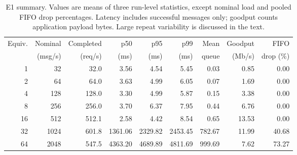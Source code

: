 \begin{table}[t]
    \centering
    \caption{E1 summary. Values are means of three run-level statistics,
    except nominal load and pooled FIFO drop percentages. Latency
    includes successful messages only; goodput counts application
    payload bytes. Large repeat variability is discussed in the text.}
    \label{tab:e1story-summary}
    \small
    \setlength{\tabcolsep}{4pt}
    \begin{tabular}{rrrrrrrrr}
        \toprule
        Equiv. & Nominal & Completed & p50 & p95 & p99 & Mean & Goodput & FIFO \\
        & (msg/s) & (req/s) & (ms) & (ms) & (ms) & queue & (Mb/s) & drop (\%) \\
        \midrule
        1  & 32   & 32.0  & 3.56    & 4.54    & 5.45    & 0.03   & 0.85  & 0.00 \\
        2  & 64   & 64.0  & 3.63    & 4.99    & 6.05    & 0.07   & 1.69  & 0.00 \\
        4  & 128  & 128.0 & 3.30    & 4.99    & 5.87    & 0.15   & 3.38  & 0.00 \\
        8  & 256  & 256.0 & 3.70    & 6.37    & 7.95    & 0.44   & 6.76  & 0.00 \\
        16 & 512  & 512.1 & 2.58    & 4.42    & 8.54    & 0.65   & 13.53 & 0.00 \\
        32 & 1024 & 601.8 & 1361.06 & 2329.82 & 2453.45 & 782.67 & 11.99 & 40.68 \\
        64 & 2048 & 547.5 & 4363.20 & 4689.89 & 4811.69 & 999.69 & 7.62  & 73.27 \\
        \bottomrule
    \end{tabular}
\end{table}
